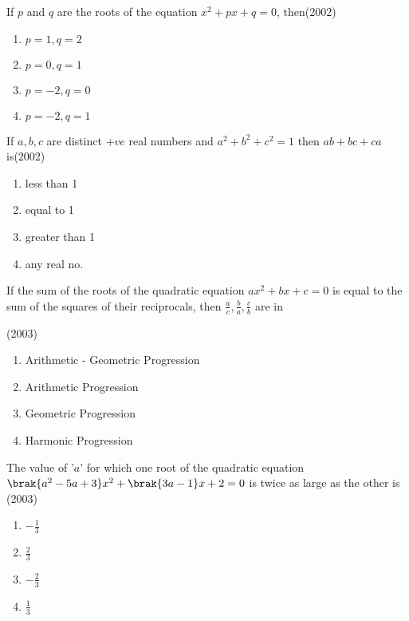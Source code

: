 \item 
If $p$ and $q$ are the roots of the equation ${x^{2}+px+q=0}$, then\hfill(2002)
\begin{multicols}{2}
\begin{enumerate}

\item$p=1,q=2$

\item$p=0,q=1$

\item$p=-2,q=0$

\item$p=-2,q=1$
\end{enumerate}
\end{multicols}

\item 
If $a,b,c$ are distinct $+ve$ real numbers and ${a^{2}+b^{2}+c^{2}=1}$ then ${ab+bc+ca}$ is\hfill(2002)
\begin{multicols}{2}
\begin{enumerate}

\item less than 1

\item equal to 1

\item greater than 1

\item any real no.
\end{enumerate}
\end{multicols}
\item 
If the sum of the roots of the quadratic equation ${ax^{2}+bx+c=0}$ is equal to the sum of the squares of their reciprocals, then $\frac{a}{c},\frac{b}{a},\frac{c}{b}$ are in 

\hfill(2003) 

\begin{enumerate}
\item
Arithmetic - Geometric Progression

\item 
Arithmetic Progression

\item 
Geometric Progression

\item 
Harmonic Progression
\end{enumerate}

\item 
The value of '$a$' for which one root of the quadratic equation ${\brak{a^{2}-5a+3}x^{2}+\brak{3a-1}x+2=0}$ is twice as large as the other is \hfill(2003)
\begin{multicols}{2}

\begin{enumerate}
\item $-\frac{1}{3}$

\item $\frac{2}{3}$

\item $-\frac{2}{3}$

\item $\frac{1}{3}$
\end{enumerate}

\end{multicols}

